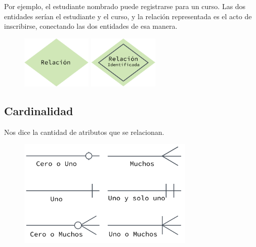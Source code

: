 \documentclass[12pt, fleqn]{report}                             %
\begin{document}
            Por ejemplo, el estudiante nombrado puede registrarse para un curso.
            Las dos entidades serían el estudiante y el curso, y la relación representada es
            el acto de inscribirse, conectando las dos entidades de esa manera. 

            \begin{figure}[h]
                \centering
                \includegraphics[width=0.30\textwidth]{Relacion}
                \includegraphics[width=0.30\textwidth]{RelacionIdentificada}
            \end{figure}


        \subsection{Cardinalidad}

            Nos dice la cantidad de atributos que se relacionan.


            \begin{figure}[h]
                \centering
                \includegraphics[width=0.75\textwidth]{Cardinalidad}
            \end{figure}
\end{document}
